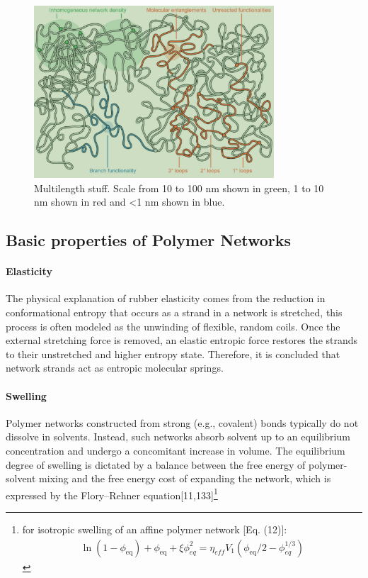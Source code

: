 \begin{figure}[ht!]
    \centering
    \includegraphics[width=0.8\textwidth]{figs/multilengthTopology.png}
    \caption{Multilength stuff. Scale from 10 to 100 nm shown in green, 1 to 10 nm shown in red and <1 nm shown in blue. }\label{fig:lengthScales}
\end{figure}

\subsection{Basic properties of Polymer Networks} 

\paragraph{Elasticity} The physical explanation of rubber elasticity comes from the reduction in conformational entropy that occurs as a strand in a network is stretched, this process is often modeled as the unwinding of flexible, random coils. 
Once the external stretching force is removed, an elastic entropic force restores the strands to their unstretched and higher entropy state. 
Therefore, it is concluded that network strands act as entropic molecular springs\citep{guPolymerNetworksPlastics2020}. 

\paragraph{Swelling} Polymer networks constructed from strong (e.g., covalent) bonds typically do not dissolve in solvents. 
Instead, such networks absorb solvent up to an equilibrium concentration and undergo a concomitant increase in volume. 
The equilibrium degree of swelling is dictated by a balance between the free energy of polymer-solvent mixing and the free energy cost of expanding the network, which is expressed by the Flory–Rehner equation[11,133]\footnote{for isotropic swelling of an affine polymer network [Eq. (12)]:
    \begin{gather*}
        \ln(1-\phi_{\mathrm{eq}}) + \phi_{\mathrm{eq}} + \xi\phi^2_{eq} = \eta_{eff}V_1(\phi_{\mathrm{eq}}/2-\phi^{1/3}_{eq})
    \end{gather*}
}

